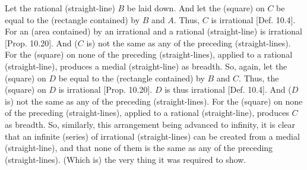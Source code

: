 \begin{Parallel}{}{}
{Let the rational (straight-line) $B$ be laid down. And let the (square) on $C$
be equal to the (rectangle contained) by $B$ and $A$. Thus, $C$ is
irrational [Def. 10.4]. For an (area contained) by
an irrational and a rational (straight-line) is irrational [Prop. 10.20]. And ($C$ is) not the same as
any of the preceding (straight-lines). For the (square) on none of
the preceding (straight-lines), applied to a rational (straight-line),
produces a medial (straight-line) as breadth. So, again, let the (square)
on $D$ be equal to the (rectangle contained) by $B$ and $C$. Thus,
the (square) on $D$ is irrational [Prop. 10.20]. 
$D$ is thus irrational [Def. 10.4]. And ($D$ is)
not the same as any of the preceding (straight-lines). For the (square) on
none of the preceding (straight-lines), applied to a rational (straight-line),
produces $C$ as breadth. So, similarly, this arrangement being
advanced to infinity, it is clear that an infinite (series) of irrational (straight-lines) can be created from a medial
(straight-line), and that none of them is the same as any of the preceding
(straight-lines). (Which is) the very thing it was required to show.}
\end{Parallel}
